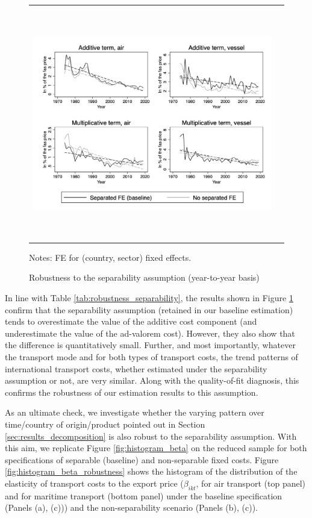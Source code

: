 \documentclass[a4paper,11pt]{article}
\begin{document}
\begin{figure}[htbp]
\caption{Robustness to the separability assumption (year-to-year basis)}
\label{fig:robustesse_non_separe}
\begin{center}
\begin{tabular}{cc}
\includegraphics[width=6in, height=4in]{graph_robustesse_ns.jpg}

\end{tabular}
\end{center}
\begin{minipage} [c]  {5in} \scriptsize%
Notes: FE for (country, sector) fixed effects.
\end{minipage}
\end{figure}

In line with Table \ref{tab:robustness_separability}, the results shown in Figure \ref{fig:robustesse_non_separe} confirm that the separability assumption (retained in our baseline estimation) tends to overestimate the value of the additive cost component (and underestimate the value of the ad-valorem cost).
However, they also show that the difference is quantitatively small. Further, and most importantly, whatever the transport mode and for both types of transport costs, the trend patterns of international transport costs, whether estimated under the separability assumption or not, are very similar. Along with the quality-of-fit diagnosis, this confirms the robustness of our estimation results to this assumption.

As an ultimate check, we investigate whether the varying pattern over time/country of origin/product pointed out in Section \ref{sec:results_decomposition} is also robust to the separability assumption. With this aim, we replicate Figure \ref{fig:histogram_beta} on the reduced sample for both specifications of separable (baseline) and non-separable fixed costs.
Figure \ref{fig:histogram_beta_robustness} shows the histogram of the distribution of the elasticity of transport costs to the export price ($\beta_{ikt}$, for air transport (top panel) and for maritime transport (bottom panel) under the baseline specification (Panels (a), (c))) and the non-separability scenario (Panels (b), (c)).
\end{document}
